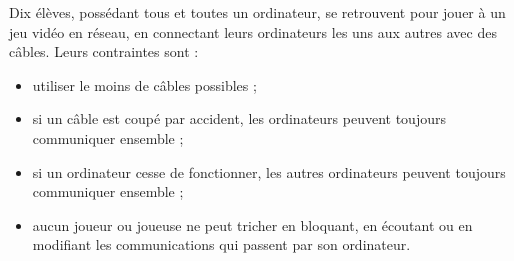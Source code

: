 %
%
%
%
%
%
%
%
%
%

\pagestyle{fancy}
\setlength{\headheight}{40pt} %
\renewcommand{\headrulewidth}{0.8pt}
\setlength{\textheight}{26cm}
\rhead{}
\renewcommand{\footrulewidth}{1pt}
\cfoot{}



\usepackage{mdframed}



Dix élèves, possédant tous et toutes un ordinateur, se retrouvent pour jouer à un jeu vidéo en réseau, en connectant leurs ordinateurs les uns aux autres avec des câbles. Leurs contraintes sont :

\begin{itemize}
  \item utiliser le moins de câbles possibles ;
  \item si un câble est coupé par accident, les ordinateurs peuvent toujours communiquer ensemble ;
  \item si un ordinateur cesse de fonctionner, les autres ordinateurs peuvent toujours communiquer ensemble ;
  \item aucun joueur ou joueuse ne peut tricher en bloquant, en écoutant ou en modifiant les communications qui passent par son ordinateur.
\end{itemize}

